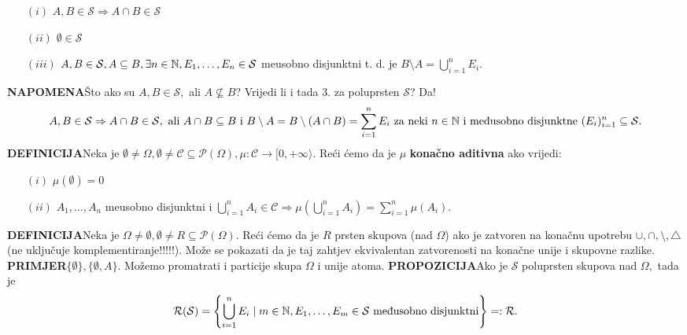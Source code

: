 \documentclass{article}
\begin{document}
\begin{enumerate}
    \item[\((i)\)] \(A,B\in\mathcal S\Rightarrow A\cap B\in\mathcal S\)
    \item[\((ii)\)] \(\emptyset\in\mathcal S\)
    \item[\((iii)\)] \(A,B\in\mathcal S,A\subseteq B,\exists n\in\Bbb N, E_1,\ldots,E_n\in\mathcal S\) me\dj{}usobno disjunktni t. d. je \(B\setminus A=\bigcup_{i=1}^nE_i.\)
\end{enumerate}
\textbf{NAPOMENA}\newline Što ako su \(A,B\in\mathcal S,\) ali \(A\nsubseteq B\)? Vrijedi li i tada \(3.\) za poluprsten \(\mathcal S\)? Da! \[A,B\in\mathcal S\Rightarrow A\cap B\in\mathcal S,\text{ ali }A\cap B\subseteq B\text{ i }B\setminus A=B\setminus(A\cap B)=\sum_{i=1}^nE_i\text{ za neki }n\in\Bbb N\text{ i me\dj{}usobno disjunktne }(E_i)_{i=1}^n\subseteq\mathcal S.\] 
\textbf{DEFINICIJA}\newline Neka je \(\emptyset\ne\Omega,\emptyset\ne\mathcal C\subseteq\mathcal P(\Omega),\mu:\mathcal C\to[0,+\infty\rangle.\) Reći ćemo da je \(\mu\) \textbf{konačno aditivna} ako vrijedi: 
\begin{enumerate}
    \item[\((i)\)] \(\mu(\emptyset)=0\)
    \item[\((ii)\)] \(A_1,\ldots,A_n\) me\dj{}usobno disjunktni i \(\bigcup_{i=1}^nA_i\in\mathcal C\Rightarrow\mu\left(\bigcup_{i=1}^nA_i\right)=\sum_{i=1}^n\mu(A_i).\)
\end{enumerate}
\textbf{DEFINICIJA}\newline Neka je \(\Omega\ne\emptyset,\emptyset\ne R\subseteq\mathcal P(\Omega).\) Reći ćemo da je \(R\) prsten skupova (nad \(\Omega\)) ako je zatvoren na konačnu upotrebu \(\cup,\cap,\setminus,\triangle\) (ne uključuje komplementiranje!!!!!). Može se pokazati da je taj zahtjev ekvivalentan zatvorenosti na konačne unije i skupovne razlike.\newline\newline
\textbf{PRIMJER}\newline \(\{\emptyset\},\{\emptyset, A\}.\) Možemo promatrati i particije skupa \(\Omega\) i unije atoma.\newline\newline
\textbf{PROPOZICIJA}\newline Ako je \(\mathcal S\) poluprsten skupova nad \(\Omega,\) tada je \[\mathcal R(\mathcal S)=\left\{\bigcup_{i=1}^n E_i\mid m\in\Bbb N, E_1,\ldots,E_m\in\mathcal S\text{ me\dj{}usobno disjunktni}\right\}=:\mathcal R.\]
\end{document}
